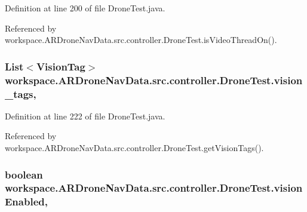 Definition at line 200 of file Drone\+Test.\+java.



Referenced by workspace.\+A\+R\+Drone\+Nav\+Data.\+src.\+controller.\+Drone\+Test.\+is\+Video\+Thread\+On().

\hypertarget{classworkspace_1_1_a_r_drone_nav_data_1_1src_1_1controller_1_1_drone_test_af153d371e05927c3d0c1fa82667523d1}{}
\subsubsection[{vision\+\_\+tags}]{\setlength{\rightskip}{0pt plus 5cm}List$<${\bf Vision\+Tag}$>$ workspace.\+A\+R\+Drone\+Nav\+Data.\+src.\+controller.\+Drone\+Test.\+vision\+\_\+tags\hspace{0.3cm}{\ttfamily [static]}, {\ttfamily [protected]}}\label{classworkspace_1_1_a_r_drone_nav_data_1_1src_1_1controller_1_1_drone_test_af153d371e05927c3d0c1fa82667523d1}


Definition at line 222 of file Drone\+Test.\+java.



Referenced by workspace.\+A\+R\+Drone\+Nav\+Data.\+src.\+controller.\+Drone\+Test.\+get\+Vision\+Tags().

\hypertarget{classworkspace_1_1_a_r_drone_nav_data_1_1src_1_1controller_1_1_drone_test_a866fc89ff705747dce53ab8eb78005bc}{}
\subsubsection[{vision\+Enabled}]{\setlength{\rightskip}{0pt plus 5cm}boolean workspace.\+A\+R\+Drone\+Nav\+Data.\+src.\+controller.\+Drone\+Test.\+vision\+Enabled\hspace{0.3cm}{\ttfamily [static]}, {\ttfamily [protected]}}\label{classworkspace_1_1_a_r_drone_nav_data_1_1src_1_1controller_1_1_drone_test_a866fc89ff705747dce53ab8eb78005bc}



